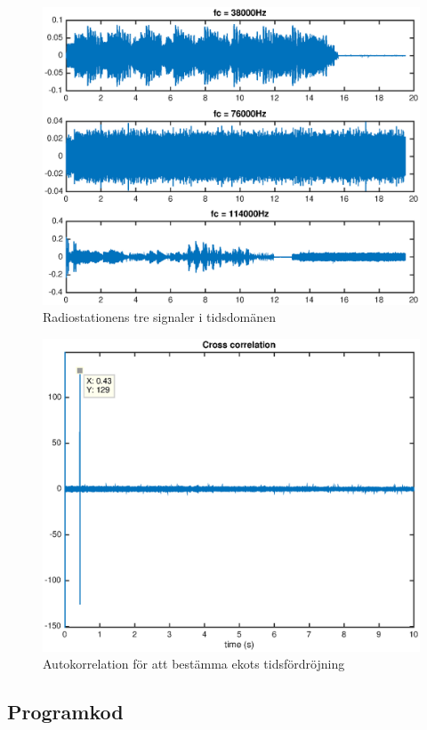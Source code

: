 \documentclass[10pt]{article}
\begin{document}
\begin{figure}
  \centering
  \includegraphics[scale=0.55]{figurer/signaler.eps}
  \caption{Radiostationens tre signaler i tidsdomänen}
  \label{signaler}
\end{figure}

\begin{figure}
  \centering
  \includegraphics[scale=0.55]{figurer/xcorr.eps}
  \caption{Autokorrelation för att bestämma ekots tidsfördröjning}
  \label{xcorr}
\end{figure}

\clearpage

\begin{multicols}{2}
\begin{appendices}
\section{Programkod}

\end{appendices}
\end{multicols}
\end{document}
